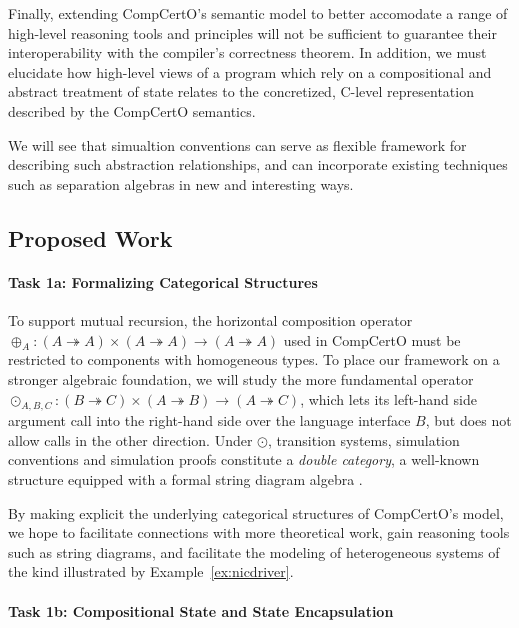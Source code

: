 Finally,
extending CompCertO's semantic model
to better accomodate a range of high-level
reasoning tools and principles
will not be sufficient to guarantee their interoperability
with the compiler's correctness theorem.
In addition,
we must elucidate how high-level views of a program
which rely on a compositional and abstract treatment of state
relates to the concretized, C-level representation
described by the CompCertO semantics.

We will see that simualtion conventions
can serve as flexible framework for describing
such abstraction relationships,
and can incorporate existing techniques
such as separation algebras \cite{sepalg}
in new and interesting ways.

\subsection{Proposed Work}

\paragraph*{Task 1a: Formalizing Categorical Structures}

To support mutual recursion,
the horizontal composition operator
${\oplus_A} : (A \twoheadrightarrow A) \times (A \twoheadrightarrow A)
  \rightarrow (A \twoheadrightarrow A)$
used in CompCertO
must be restricted to components with homogeneous types.
To place our framework on a stronger algebraic foundation,
we will study the more fundamental operator
${\odot_{A,B,C}} : (B \twoheadrightarrow C) \times (A \twoheadrightarrow B)
  \rightarrow (A \twoheadrightarrow C)$,
which lets its left-hand side argument call into
the right-hand side over the language interface $B$,
but does not allow calls in the other direction.
Under $\odot$,
transition systems, simulation conventions and simulation proofs
constitute a \emph{double category},
a well-known structure equipped with a formal string diagram algebra
\cite{dcsd}.

By making explicit the underlying categorical structures
of CompCertO's model,
we hope to facilitate connections with more theoretical work,
gain reasoning tools such as string diagrams,
and facilitate the modeling of heterogeneous systems
of the kind illustrated by Example~\ref{ex:nicdriver}.

\vspace*{-2ex}
\paragraph*{Task 1b: Compositional State and State Encapsulation}

